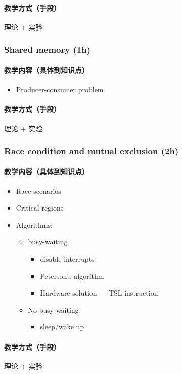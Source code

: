 \documentclass[11pt]{article}
\begin{document}
\paragraph{教学方式（手段）}
\label{sec-3-2-1-2}
理论 + 实验
\subsubsection{Shared memory (1h)}
\label{sec-3-2-2}
\paragraph{教学内容（具体到知识点）}
\label{sec-3-2-2-1}
\begin{itemize}
\item Producer-consumer problem
\end{itemize}
\paragraph{教学方式（手段）}
\label{sec-3-2-2-2}
理论 + 实验
\subsubsection{Race condition and mutual exclusion (2h)}
\label{sec-3-2-3}
\paragraph{教学内容（具体到知识点）}
\label{sec-3-2-3-1}
\begin{itemize}
\item Race scenarios
\item Critical regions
\item Algorithms: 
\begin{itemize}
\item busy-waiting
\begin{itemize}
\item disable interrupts
\item Peterson's algorithm
\item Hardware solution --- TSL instruction
\end{itemize}
\item No busy-waiting
\begin{itemize}
\item sleep/wake up
\end{itemize}
\end{itemize}
\end{itemize}
\paragraph{教学方式（手段）}
\label{sec-3-2-3-2}
理论 + 实验
\end{document}
